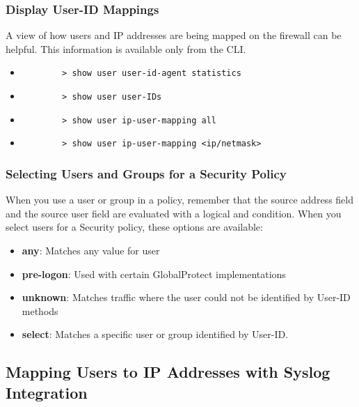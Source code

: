 \subsubsection{Display User-ID Mappings}
A view of how users and IP addresses are being mapped on the firewall can be helpful.
This information is available only from the CLI.
\begin{itemize}
    \item \begin{verbatim}
        > show user user-id-agent statistics
    \end{verbatim}
    \item \begin{verbatim}
        > show user user-IDs
    \end{verbatim}
    \item \begin{verbatim}
        > show user ip-user-mapping all
    \end{verbatim}
    \item \begin{verbatim}
        > show user ip-user-mapping <ip/netmask>
    \end{verbatim}
\end{itemize}

\subsubsection{Selecting Users and Groups for a Security Policy}
When you use a user or group in a policy, remember that the source address field and the source user field are evaluated with a logical and condition. 
When you select users for a Security policy, these options are available:
\begin{itemize}
    \item \textbf{any}: Matches any value for user
    \item \textbf{pre-logon}: Used with certain GlobalProtect implementations
    \item \textbf{unknown}: Matches traffic where the user could not be identified by User-ID methods
    \item \textbf{select}: Matches a specific user or group identified by User-ID.
\end{itemize}

\subsection{Mapping Users to IP Addresses with Syslog Integration}

